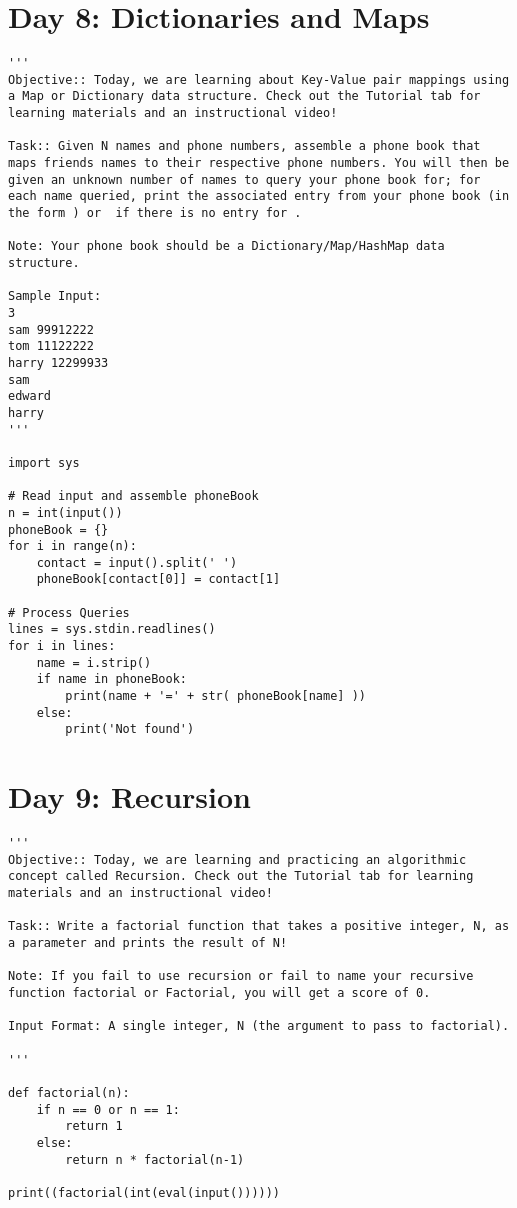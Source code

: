 \documentclass[11pt,a4paper]{article}
\begin{document}
\newpage
\section{Day 8: Dictionaries and Maps}
\begin{lstlisting}
'''
Objective:: Today, we are learning about Key-Value pair mappings using a Map or Dictionary data structure. Check out the Tutorial tab for learning materials and an instructional video!

Task:: Given N names and phone numbers, assemble a phone book that maps friends names to their respective phone numbers. You will then be given an unknown number of names to query your phone book for; for each name queried, print the associated entry from your phone book (in the form ) or  if there is no entry for .

Note: Your phone book should be a Dictionary/Map/HashMap data structure.

Sample Input:
3
sam 99912222
tom 11122222
harry 12299933
sam
edward
harry
'''

import sys 

# Read input and assemble phoneBook
n = int(input())
phoneBook = {}
for i in range(n):
    contact = input().split(' ')
    phoneBook[contact[0]] = contact[1]

# Process Queries
lines = sys.stdin.readlines()
for i in lines:
    name = i.strip()
    if name in phoneBook:
        print(name + '=' + str( phoneBook[name] ))
    else:
        print('Not found')
\end{lstlisting}


\newpage
\section{Day 9: Recursion}
\begin{lstlisting}
'''
Objective:: Today, we are learning and practicing an algorithmic concept called Recursion. Check out the Tutorial tab for learning materials and an instructional video!

Task:: Write a factorial function that takes a positive integer, N, as a parameter and prints the result of N! 

Note: If you fail to use recursion or fail to name your recursive function factorial or Factorial, you will get a score of 0.

Input Format: A single integer, N (the argument to pass to factorial).

'''

def factorial(n):
    if n == 0 or n == 1:
        return 1
    else:
        return n * factorial(n-1)

print((factorial(int(eval(input())))))

\end{lstlisting}
\end{document}
